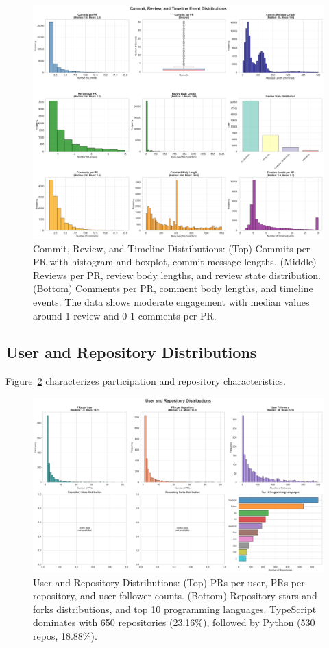 \documentclass[11pt]{article}
\begin{document}
\begin{figure}[H]
\centering
\includegraphics[width=\textwidth]{figures/commit_review_timeline_distributions.png}
\caption{Commit, Review, and Timeline Distributions: (Top) Commits per PR with histogram and boxplot, commit message lengths. (Middle) Reviews per PR, review body lengths, and review state distribution. (Bottom) Comments per PR, comment body lengths, and timeline events. The data shows moderate engagement with median values around 1 review and 0-1 comments per PR.}
\label{fig:commit_review}
\end{figure}

\subsection{User and Repository Distributions}

Figure~\ref{fig:user_repo} characterizes participation and repository characteristics.

\begin{figure}[H]
\centering
\includegraphics[width=\textwidth]{figures/user_repo_distributions.png}
\caption{User and Repository Distributions: (Top) PRs per user, PRs per repository, and user follower counts. (Bottom) Repository stars and forks distributions, and top 10 programming languages. TypeScript dominates with 650 repositories (23.16\%), followed by Python (530 repos, 18.88\%).}
\label{fig:user_repo}
\end{figure}
\end{document}
